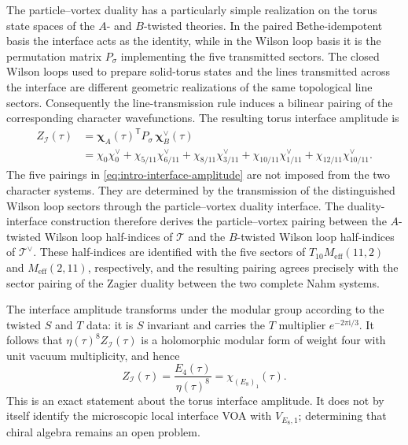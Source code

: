 \documentclass[11pt,a4paper]{article}
\numberwithin{equation}{section}
\begin{document}
The particle--vortex duality has a particularly simple realization on the torus state spaces of the $A$- and $B$-twisted theories.  In the paired Bethe-idempotent basis the interface acts as the identity, while in the Wilson loop basis it is the permutation matrix $P_\sigma$ implementing the five transmitted sectors.  The closed Wilson loops used to prepare solid-torus states and the lines transmitted across the interface are different geometric realizations of the same topological line sectors.  Consequently the line-transmission rule induces a bilinear pairing of the corresponding character wavefunctions.  The resulting torus interface amplitude is
\begin{align}
  Z_{\mathcal I}(\tau)
  &=\boldsymbol\chi_A(\tau)^{\mathsf T}
   P_\sigma\,
   \boldsymbol\chi_B^\vee(\tau)
   \nonumber\\
  &=\chi_0\chi_0^\vee
   +\chi_{5/11}\chi_{6/11}^\vee
   +\chi_{8/11}\chi_{3/11}^\vee
   +\chi_{10/11}\chi_{1/11}^\vee
   +\chi_{12/11}\chi_{10/11}^\vee.
  \label{eq:intro-interface-amplitude}
\end{align}
The five pairings in \eqref{eq:intro-interface-amplitude} are not imposed from the two character systems.  They are determined by the transmission of the distinguished Wilson loop sectors through the particle--vortex duality interface.  The duality-interface construction therefore derives the particle--vortex pairing between the $A$-twisted Wilson loop half-indices of $\mathcal T$ and the $B$-twisted Wilson loop half-indices of $\mathcal T^\vee$.  These half-indices are identified with the five sectors of $T_{10}M_{\mathrm{eff}}(11,2)$ and $M_{\mathrm{eff}}(2,11)$, respectively, and the resulting pairing agrees precisely with the sector pairing of the Zagier duality between the two complete Nahm systems.

The interface amplitude transforms under the modular group according to the twisted $S$ and $T$ data: it is $S$ invariant and carries the $T$ multiplier $e^{-2\pi\mathrm{i}/3}$.  It follows that $\eta(\tau)^8 Z_{\mathcal I}(\tau)$ is a holomorphic modular form of weight four with unit vacuum multiplicity, and hence
\begin{equation}
  Z_{\mathcal I}(\tau)
  =\frac{E_4(\tau)}{\eta(\tau)^8}
  =\chi_{(E_8)_1}(\tau).
  \label{eq:intro-E8-character}
\end{equation}
This is an exact statement about the torus interface amplitude.  It does not by itself identify the microscopic local interface VOA with $V_{E_8,1}$; determining that chiral algebra remains an open problem.
\end{document}
